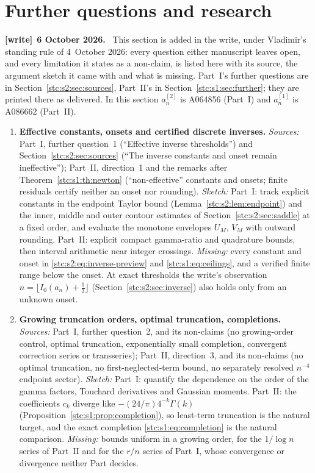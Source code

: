 \documentclass[11pt,letterpaper]{article}
\numberwithin{equation}{section}
\theoremstyle{remark}\newtheorem{remark}[theorem]{Remark}
\newenvironment{writenote}[1][]{\par\smallskip\begingroup\small
 \noindent\textbf{[write]}\if\relax\detokenize{#1}\relax\else~\textbf{#1.}\fi\ }%
 {\par\endgroup\smallskip}
\begin{document}
\section{Further questions and research}\label{stc:sec:further}
\begin{writenote}[6 October 2026]
This section is added in the write, under Vladimir's standing rule of 4~October 2026: every question either manuscript leaves open, and every limitation it states as a non-claim, is listed here with its source, the argument sketch it came with and what is missing. Part~I's further questions are in Section~\ref{stc:s2:sec:sources}, Part~II's in Section~\ref{stc:s1:sec:further}; they are printed there as delivered. In this section $a^{[2]}_n$ is A064856 (Part~I) and $a^{[1]}_n$ is A086662 (Part~II).
\end{writenote}
\begin{enumerate}
\item\label{stc:q:effective} \textbf{Effective constants, onsets and certified discrete inverses.} \emph{Sources:} Part~I, further question~1 (``Effective inverse thresholds'') and Section~\ref{stc:s2:sec:sources} (``The inverse constants and onset remain ineffective''); Part~II, direction~1 and the remarks after Theorem~\ref{stc:s1:th:newton} (``non-effective'' constants and onsets; finite residuals certify neither an onset nor rounding). \emph{Sketch:} Part~I: track explicit constants in the endpoint Taylor bound (Lemma~\ref{stc:s2:lem:endpoint}) and the inner, middle and outer contour estimates of Section~\ref{stc:s2:sec:saddle} at a fixed order, and evaluate the monotone envelopes $U_M$, $V_M$ with outward rounding. Part~II: explicit compact gamma-ratio and quadrature bounds, then interval arithmetic near integer crossings. \emph{Missing:} every constant and onset in \eqref{stc:s2:eq:inverse-preview} and \eqref{stc:s1:eq:ceilings}, and a verified finite range below the onset. At exact thresholds the write's observation $n=\lfloor I_0(a_n)+\frac12\rfloor$ (Section~\ref{stc:s2:sec:inverse}) also holds only from an unknown onset.
\item\label{stc:q:growing} \textbf{Growing truncation orders, optimal truncation, completions.} \emph{Sources:} Part~I, further question~2, and its non-claims (no growing-order control, optimal truncation, exponentially small completion, convergent correction series or transseries); Part~II, direction~3, and its non-claims (no optimal truncation, no first-neglected-term bound, no separately resolved $n^{-4}$ endpoint sector). \emph{Sketch:} Part~I: quantify the dependence on the order of the gamma factors, Touchard derivatives and Gaussian moments. Part~II: the coefficients $c_k$ diverge like $-(24/\pi)4^{-k}\Gamma(k)$ (Proposition~\ref{stc:s1:prop:completion}), so least-term truncation is the natural target, and the exact completion \eqref{stc:s1:eq:completion} is the natural comparison. \emph{Missing:} bounds uniform in a growing order, for the $1/\log n$ series of Part~II and for the $r/n$ series of Part~I, whose convergence or divergence neither Part decides.

\end{enumerate}
\end{document}

